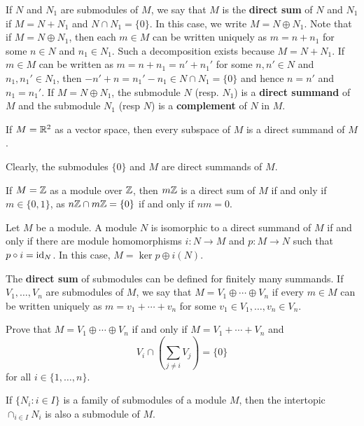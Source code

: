 If $N$ and $N_1$ are submodules of $M$, we say that $M$ is the \textbf{direct sum} of $N$ and $N_1$
if $M=N+N_1$ and $N\cap N_1=\{0\}$. In this case, we write $M=N\oplus N_1$. Note that if
$M=N\oplus N_1$, then each $m\in M$ can be written uniquely as $m=n+n_1$ for some
 $n\in N$ and $n_1\in N_1$. 
Such a decomposition exists because $M=N+N_1$. If $m\in M$ can be written as 
$m=n+n_1=n'+n_1'$ for some $n,n'\in N$ and $n_1,n_1'\in N_1$, then 
$-n'+n=n_1'-n_1\in N\cap N_1=\{0\}$ and hence $n=n'$ and $n_1=n_1'$. If $M=N\oplus N_1$, the submodule
$N$ (resp. $N_1$) is a \textbf{direct summand} of $M$ and the submodule $N_1$ (resp $N$) is a \textbf{complement} of $N$ 
in $M$.   	

\begin{example}
If $M=\mathbb{R}^2$ as a vector space, then every subspace of $M$ is a direct summand of $M$.
\end{example}

Clearly, the submodules $\{0\}$ and $M$ are direct summands of $M$.

\begin{example}
If $M=\mathbb{Z}$ as a module over $\mathbb{Z}$, then $m\mathbb{Z}$ is a direct sum of $M$ if and only if 
$m\in\{0,1\}$, as $n\mathbb{Z}\cap m\mathbb{Z}=\{0\}$ if and only if $nm=0$.
\end{example}

\begin{exercise}
\label{xca:projector}
Let $M$ be a module. 
A module $N$ is isomorphic to a direct summand of $M$ if and only if
there are module homomorphisms $i\colon N\to M$ and $p\colon M\to N$ 
such that $p\circ i=\operatorname{id}_N$. In this case, $M=\ker p\oplus i(N)$.  
\end{exercise}

The \textbf{direct sum} of submodules can be defined for finitely many summands. 
If $V_1,\dots,V_n$ are submodules of $M$, we say that $M=V_1\oplus\cdots\oplus V_n$ 
if every $m\in M$ can be written uniquely as $m=v_1+\cdots+v_n$ for some $v_1\in V_1,\dots,v_n\in V_n$. 

\begin{exercise}
Prove that $M=V_1\oplus\cdots\oplus V_n$ if and only if 
$M=V_1+\cdots+V_n$ and 
\[
V_i\cap\left(\sum_{j\ne i}V_j\right)=\{0\}
\]	
for all $i\in\{1,\dots,n\}$.
\end{exercise}

If $\{N_i:i\in I\}$ is a family of submodules of a module $M$, then the intertopic 
$\cap_{i\in I}N_i$ is also a submodule of $M$.

